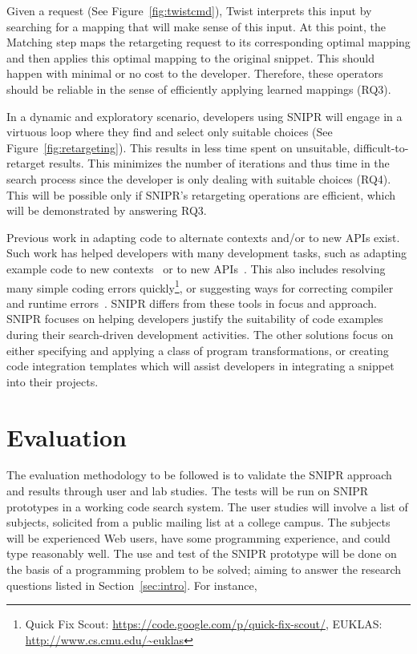 \documentclass[conference]{IEEEtran}
\begin{document}
Given a request (See Figure~\ref{fig:twistcmd}), Twist interprets this input by searching for a mapping that will make sense of this input. At this point, the Matching step maps the retargeting request to its corresponding optimal mapping and then applies this optimal mapping to the original snippet. This should happen with minimal or no cost to the developer. Therefore, these operators should be reliable in the sense of efficiently applying learned mappings (RQ3).

In a dynamic and exploratory scenario, developers using \uppercase{SNIPR} will engage in a virtuous loop where they find and select only suitable choices (See Figure~\ref{fig:retargeting}). This results in less time spent on unsuitable, difficult-to-retarget results. This minimizes the number of iterations and thus time in the search process since the developer is only dealing with suitable choices (RQ4). This will be possible only if \uppercase{SnipR}'s retargeting operations are efficient, which will be demonstrated by answering RQ3.

Previous work in adapting code to alternate contexts and/or to new APIs exist. Such work has helped developers with many development tasks, such as adapting example code to new contexts~\cite{Wightman:2012gc} or to new APIs~\cite{Nita:2010en}. This also includes resolving many simple coding errors quickly\footnote{{Quick Fix Scout: \url{https://code.google.com/p/quick-fix-scout/}}, {EUKLAS: \url{http://www.cs.cmu.edu/~euklas}}}, or suggesting ways for correcting compiler and runtime errors~\cite{Hartmann:2010hx}. \uppercase{SnipR} differs from these tools in focus and approach. \uppercase{SnipR} focuses on helping developers justify the suitability of code examples during their search-driven development activities. The other solutions focus on either specifying and applying a class of program transformations, or creating code integration templates which will assist developers in integrating a snippet into their projects. 

\section{Evaluation}
\label{sec:evaluate}

The evaluation methodology to be followed is to validate the \uppercase{SnipR} approach and results through user and lab studies. The tests will be run on \uppercase{SnipR} prototypes in a working code search system. The user studies will involve a list of subjects, solicited from a public mailing list at a college campus. The subjects will be experienced Web users, have some programming experience, and could type reasonably well. The use and test of the \uppercase{SnipR} prototype will be done on the basis of a programming problem to be solved; aiming to answer the research questions listed in Section~\ref{sec:intro}. For instance,
\end{document}
